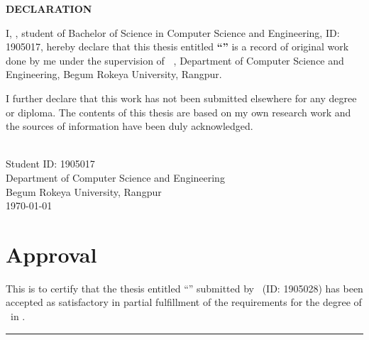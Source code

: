% 

\thispagestyle{empty}
\vspace*{1cm}

\begin{center}
    {\Large\bfseries DECLARATION}
\end{center}

\vspace{0.8cm}

I, \textbf{\theauthor}, student of Bachelor of Science in Computer Science and Engineering, ID: 1905017, hereby declare that this thesis entitled \textbf{``\projectTitle''} is a record of original work done by me under the supervision of \textbf{\thesupervisortitle~\thesupervisor}, Department of Computer Science and Engineering, Begum Rokeya University, Rangpur.

\vspace{0.8cm}

I further declare that this work has not been submitted elsewhere for any degree or diploma. The contents of this thesis are based on my own research work and the sources of information have been duly acknowledged.

\vspace{2cm}

\begin{flushright}
    \textbf{\theauthor}\\
    Student ID: 1905017\\
    Department of Computer Science and Engineering\\
    Begum Rokeya University, Rangpur\\
    \today
\end{flushright}

\clearpage

\chapter*{Approval}
\thispagestyle{empty}
This is to certify that the thesis entitled ``\projectTitle'' submitted by \theauthor\ (ID: 1905028) has been accepted as satisfactory in partial fulfillment of the requirements for the degree of \thedegree\ in \themajor.

\vspace{3cm}
\noindent
\rule{7cm}{0.5pt}\\
\thesupervisor\\
\thesupervisortitle\\
\thedepartment\\
\theuniversity


